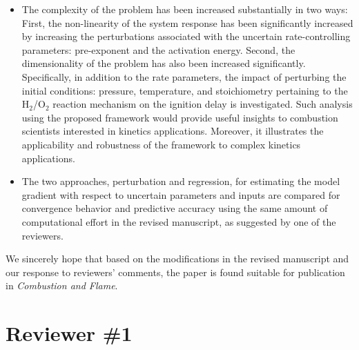 \documentclass[11pt,final]{article}
\begin{document}
\begin{itemize}

\item The complexity of the problem has been increased substantially in two ways: First, 
the non-linearity of the system response has been significantly increased by increasing
the perturbations associated with the uncertain rate-controlling parameters: pre-exponent
and the activation energy. Second, the dimensionality of the problem has also been increased
significantly. Specifically, in addition to the rate parameters, the impact of
perturbing the initial conditions: pressure, temperature, and stoichiometry pertaining to the
H$_2$/O$_2$ reaction mechanism on the ignition delay is investigated. Such analysis using the
proposed framework would provide useful insights to combustion scientists interested in
kinetics applications. Moreover, it illustrates the applicability and robustness of the 
framework to complex kinetics applications. 

\item The two approaches, perturbation and regression, for estimating the model gradient
with respect to uncertain parameters and inputs are compared for convergence behavior and
predictive accuracy using the same amount of
computational effort in the revised manuscript, as suggested by one of the reviewers. 

\end{itemize} 

We sincerely hope that based on the modifications in the revised manuscript and our 
response to reviewers' comments, the paper is found suitable for publication in
{\it Combustion and Flame}. 

\clearpage


\section*{Reviewer \#1}
\end{document}
